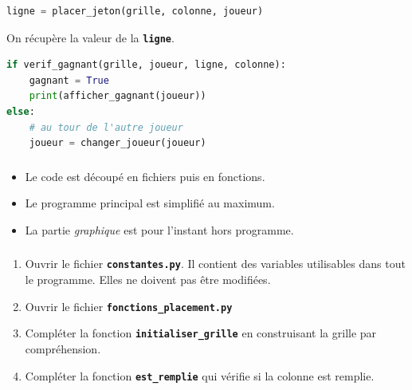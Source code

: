 \documentclass[svgnames,11pt]{beamer}
\begin{document}
\begin{frame}[fragile]

    \begin{center}
    \begin{lstlisting}[language=Python , basicstyle=\ttfamily\small, xleftmargin=2em, xrightmargin=2em]
ligne = placer_jeton(grille, colonne, joueur)
\end{lstlisting}
    \end{center}
\begin{aretenir}[Remarque]
On récupère la valeur de la \textbf{\texttt{ligne}}.
\end{aretenir}
\end{frame}
\begin{frame}[fragile]

    \begin{center}
    \begin{lstlisting}[language=Python , basicstyle=\ttfamily\small, xleftmargin=1em, xrightmargin=0em]
if verif_gagnant(grille, joueur, ligne, colonne):
    gagnant = True
    print(afficher_gagnant(joueur))
else:
    # au tour de l'autre joueur
    joueur = changer_joueur(joueur)
\end{lstlisting}
    \end{center}
\end{frame}
\begin{frame}
    \frametitle{}

    \begin{aretenir}[Remarques]
    
        \begin{itemize}
            \item Le code est découpé en fichiers puis en fonctions.
            \item Le programme principal est simplifié au maximum.
            \item La partie \emph{graphique} est pour l'instant hors programme.
        \end{itemize}
    \end{aretenir}

\end{frame}
\begin{frame}
    \frametitle{}

    \begin{activite}
    \begin{enumerate}
        \item Ouvrir le fichier \textbf{\texttt{constantes.py}}. Il contient des variables utilisables dans tout le programme. Elles ne doivent pas être modifiées.
        \item Ouvrir le fichier \textbf{\texttt{fonctions\_placement.py}}
        \item Compléter la fonction \textbf{\texttt{initialiser\_grille}} en construisant la grille par compréhension.
        \item Compléter la fonction \textbf{\texttt{est\_remplie}} qui vérifie si la colonne est remplie.
    \end{enumerate}
    \end{activite}
\end{frame}
\end{document}
